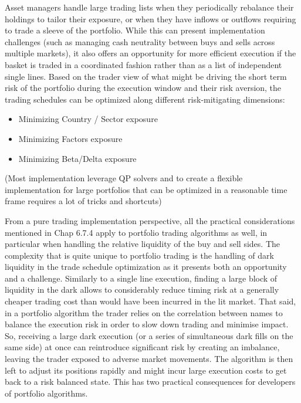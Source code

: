Asset managers handle large trading lists when they periodically rebalance their holdings to tailor their exposure, or when they have inflows or outflows requiring to trade a sleeve of the portfolio. While this can present implementation challenges (such as managing cash neutrality between buys and sells across multiple markets), it also offers an opportunity for more efficient execution if the basket is traded in a coordinated fashion rather than as a list of independent single lines. Based on the trader view of what might be driving the short term risk of the portfolio during the execution window and their risk aversion, the trading schedules can be optimized along different risk-mitigating dimensions:
\begin{itemize}
\item Minimizing Country / Sector exposure
\item Minimizing Factors exposure
\item Minimizing Beta/Delta exposure

\end{itemize}

(Most implementation leverage QP solvers and to create a flexible implementation for large portfolios that can be optimized in a reasonable time frame requires a lot of tricks and shortcuts)

From a pure trading implementation perspective, all the practical considerations mentioned in Chap 6.7.4  apply to portfolio trading algorithms as well, in particular when handling the relative liquidity of the buy and sell sides. The complexity that is quite unique to portfolio trading is the handling of dark liquidity in the trade schedule optimization as it presents both an opportunity and a challenge. Similarly to a single line execution, finding a large block of liquidity in the dark allows to considerably reduce timing risk at a generally cheaper trading cost than would have been incurred in the lit market. That said, in a portfolio algorithm the trader relies on the correlation between names to balance the execution risk in order to slow down trading and minimise impact. So, receiving a large dark execution (or a series of simultaneous dark fills on the same side) at once can reintroduce significant risk by creating an imbalance, leaving the trader exposed to adverse market movements. The algorithm is then left to adjust its positions rapidly and might incur large execution costs to get back to a risk balanced state. This has two practical consequences for developers of portfolio algorithms. 

